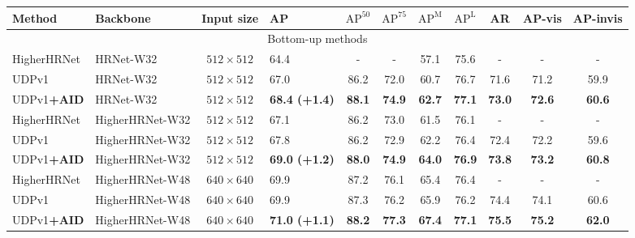\documentclass[final]{cvpr}
\begin{document}
\begin{table*}
\footnotesize
\begin{center}
\begin{tabular}{l|l|c|lccccccc}

\hline
Method                  & Backbone      &Input size        &AP  & $\text{AP}^{50}$ & $\text{AP}^{75}$ & $\text{AP}^{\text{M}}$ &$\text{AP}^{\text{L}}$    & AR  &AP-vis         &AP-invis\\
\hline
\multicolumn{11}{c}{Bottom-up methods}\\
\hline
HigherHRNet \cite{Higher}& HRNet-W32     &$512\times512$    &64.4                 & -             & -             & 57.1          &75.6           &-             &-              &-   \\
UDPv1 \cite{UDP}         & HRNet-W32     &$512\times512$    &67.0                 & 86.2          & 72.0          & 60.7          &76.7           &71.6          &71.2           &59.9\\
UDPv1\textbf{+AID}      & HRNet-W32     &$512\times512$    &\textbf{68.4 (+1.4)}  &\textbf{88.1}  &\textbf{74.9}  &\textbf{62.7}  &\textbf{77.1}  &\textbf{73.0} &\textbf{72.6}  &\textbf{60.6}\\
HigherHRNet \cite{Higher}& HigherHRNet-W32&$512\times512$   &67.1                 & 86.2          & 73.0          & 61.5          &76.1           & -            &-              &-   \\
UDPv1 \cite{UDP}         & HigherHRNet-W32&$512\times512$   &67.8                 & 86.2          & 72.9          & 62.2          &76.4           &72.4          &72.2           &59.6\\
UDPv1\textbf{+AID}      & HigherHRNet-W32&$512\times512$   &\textbf{69.0 (+1.2)}  &\textbf{88.0}  &\textbf{74.9}  &\textbf{64.0}  &\textbf{76.9}  &\textbf{73.8} &\textbf{73.2}  &\textbf{60.8}\\
HigherHRNet \cite{Higher}& HigherHRNet-W48&$640\times640$   &69.9                 & 87.2          & 76.1          & 65.4          &76.4           & -            &-              &-   \\
UDPv1 \cite{UDP}         & HigherHRNet-W48&$640\times640$   &69.9                 & 87.3          & 76.2          & 65.9          &76.2           &74.4          &74.1           &60.6\\
UDPv1\textbf{+AID}      & HigherHRNet-W48&$640\times640$   &\textbf{71.0 (+1.1)}  &\textbf{88.2}  &\textbf{77.3}  &\textbf{67.4}  &\textbf{77.1}  &\textbf{75.5} &\textbf{75.2}  &\textbf{62.0}\\

\end{tabular}
\end{center}
\end{table*}
\end{document}
